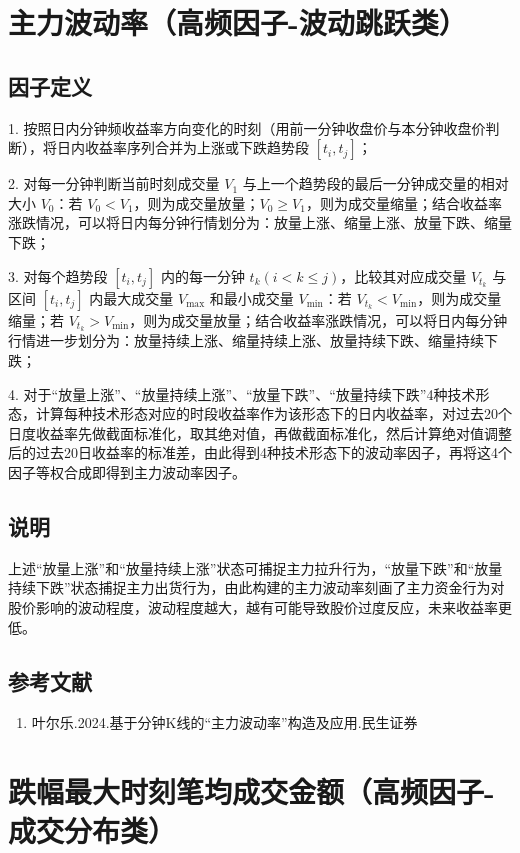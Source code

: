 \documentclass{article}
\begin{document}
\section{主力波动率（高频因子-波动跳跃类）}

\subsection{因子定义}

1. 按照日内分钟频收益率方向变化的时刻（用前一分钟收盘价与本分钟收盘价判断），将日内收益率序列合并为上涨或下跌趋势段 \([t_i, t_j]\)；

2. 对每一分钟判断当前时刻成交量 \(V_1\) 与上一个趋势段的最后一分钟成交量的相对大小 \(V_0\)：若 \(V_0 < V_1\)，则为成交量放量；\(V_0 \geq V_1\)，则为成交量缩量；结合收益率涨跌情况，可以将日内每分钟行情划分为：放量上涨、缩量上涨、放量下跌、缩量下跌；

3. 对每个趋势段 \([t_i, t_j]\) 内的每一分钟 \(t_k (i < k \leq j)\)，比较其对应成交量 \(V_{t_k}\) 与区间 \([t_i, t_j]\) 内最大成交量 \(V_{\max}\) 和最小成交量 \(V_{\min}\)：若 \(V_{t_k} < V_{\min}\)，则为成交量缩量；若 \(V_{t_k} > V_{\min}\)，则为成交量放量；结合收益率涨跌情况，可以将日内每分钟行情进一步划分为：放量持续上涨、缩量持续上涨、放量持续下跌、缩量持续下跌；

4. 对于“放量上涨”、“放量持续上涨”、“放量下跌”、“放量持续下跌”4种技术形态，计算每种技术形态对应的时段收益率作为该形态下的日内收益率，对过去20个日度收益率先做截面标准化，取其绝对值，再做截面标准化，然后计算绝对值调整后的过去20日收益率的标准差，由此得到4种技术形态下的波动率因子，再将这4个因子等权合成即得到主力波动率因子。

\subsection{说明}
上述“放量上涨”和“放量持续上涨”状态可捕捉主力拉升行为，“放量下跌”和“放量持续下跌”状态捕捉主力出货行为，由此构建的主力波动率刻画了主力资金行为对股价影响的波动程度，波动程度越大，越有可能导致股价过度反应，未来收益率更低。

\subsection{参考文献}
\begin{enumerate}
    \item 叶尔乐.2024.基于分钟K线的“主力波动率”构造及应用.民生证券
\end{enumerate}

\section{跌幅最大时刻笔均成交金额（高频因子-成交分布类）}
\end{document}
